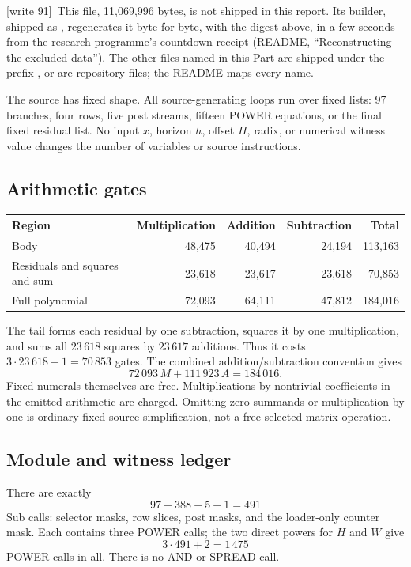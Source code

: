 \documentclass[11pt,letterpaper]{article}
\theoremstyle{definition}
\theoremstyle{remark}
\newcommand{\wtagd}{\textup{[write 91]}}
\begin{document}
\wtagd\ This file, 11,069,996 bytes, is not shipped in this report. Its builder, shipped as , regenerates it byte for byte, with the digest above, in a few seconds from the research programme's countdown receipt (README, ``Reconstructing the excluded data''). The other files named in this Part are shipped under the prefix , or are repository files; the README maps every name.

The source has fixed shape. All source-generating loops run over fixed lists: 97 branches, four rows, five post streams, fifteen POWER equations, or the final fixed residual list. No input $x$, horizon $h$, offset $H$, radix, or numerical witness value changes the number of variables or source instructions.

\subsection{Arithmetic gates}
\begin{center}
\begin{tabular}{lrrrr}
\toprule
Region & Multiplication & Addition & Subtraction & Total\\
\midrule
Body & 48,475 & 40,494 & 24,194 & 113,163\\
Residuals and squares and sum & 23,618 & 23,617 & 23,618 & 70,853\\
\midrule
Full polynomial & 72,093 & 64,111 & 47,812 & 184,016\\
\bottomrule
\end{tabular}
\end{center}
The tail forms each residual by one subtraction, squares it by one multiplication, and sums all $23\,618$ squares by $23\,617$ additions. Thus it costs $3\cdot23\,618-1=70\,853$ gates. The combined addition/subtraction convention gives
\[
 72\,093\,M+111\,923\,A=184\,016.
\]
Fixed numerals themselves are free. Multiplications by nontrivial coefficients in the emitted arithmetic are charged. Omitting zero summands or multiplication by one is ordinary fixed-source simplification, not a free selected matrix operation.

\subsection{Module and witness ledger}
There are exactly
\[
 97+388+5+1=491
\]
Sub calls: selector masks, row slices, post masks, and the loader-only counter mask. Each contains three POWER calls; the two direct powers for $H$ and $W$ give
\[
 3\cdot491+2=1\,475
\]
POWER calls in all. There is no AND or SPREAD call.
\end{document}
